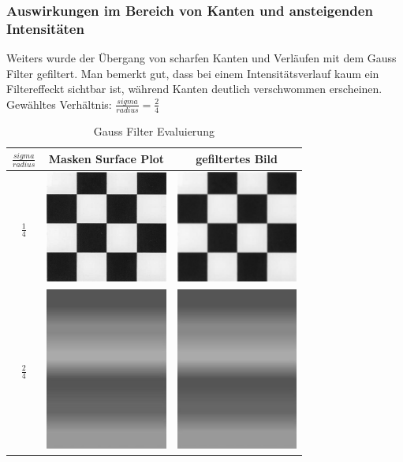 \documentclass[12pt,german]{article}
\begin{document}
\subsubsection{Auswirkungen im Bereich von Kanten und ansteigenden Intensitäten}
Weiters wurde der Übergang von scharfen Kanten und Verläufen mit dem Gauss Filter gefiltert. Man bemerkt gut, dass bei einem Intensitätsverlauf kaum ein Filtereffeckt sichtbar ist, während Kanten deutlich verschwommen erscheinen. Gewähltes Verhältnis: $ \frac{sigma}{radius} = \frac{2}{4} $
\begin{table}[H]
  \centering
  \begin{tabular}{| c | c | c |}
    \hline
    $ \frac{sigma}{radius} $ & Masken Surface Plot & gefiltertes Bild \\
    \hline
    $ \frac{1}{4} $ &
	\includegraphics[width=4cm]{../testData/Gauss/Schachbrett.jpg} & 	\includegraphics[width=4cm]{../testData/Gauss/SchachbrettR4S2.jpg} \\
	    \hline
    $ \frac{2}{4} $ &
	\includegraphics[width=4cm]{../testData/Gauss/Regenbogen.jpg} & 	\includegraphics[width=4cm]{../testData/Gauss/RegenbogenR4S2.jpg} \\
  \end{tabular}
  \caption{Gauss Filter Evaluierung}
  \label{tab:GaussFilterEvaluierung}
\end{table}
\end{document}
